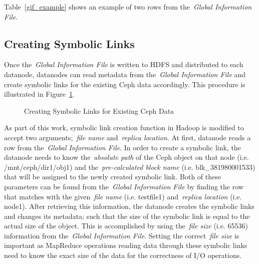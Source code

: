Table~\ref{gif_example} shows an example of two rows from the~\textit{Global Information File}.

\begin{table}[!htbp]
 \begin{center}
 \end{center}
 \caption{Example Rows from the~\textit{Global Information File}}
 \label{gif_example}
\end{table}

\subsection{Creating Symbolic Links}
\label{symlinks}
Once the~\textit{Global Information File} is written to HDFS and distributed to each datanode,
datanodes can read metadata from the~\textit{Global Information File} and create symbolic
links for the existing Ceph data accordingly. This procedure is illustrated in Figure~\ref{symbolic_lins}.

\begin{figure}[!htbp]
\centering
{}
\caption{Creating Symbolic Links for Existing Ceph Data}
\label{symbolic_lins}
\end{figure}

As part of this work, symbolic link creation function in Hadoop is modified to accept two arguments;~\textit{file name}
and~\textit{replica location}. At first, datanode reads a row from the~\textit{Global Information File}. In order to create a
symbolic link, the datanode needs to know the~\textit{absolute path} of the Ceph object on that node (i.e. /mnt/ceph/dir1/obj1)
and the~\textit{pre-calculated block name} (i.e. blk\_381980001533) that will be assigned to the newly created symbolic link.
Both of these parameters can be found from the~\textit{Global Information File} by finding the row that
matches with the given~\textit{file name} (i.e. testfile1) and~\textit{replica location} (i.e. node1). After retrieving this information,
the datanode creates the symbolic links and changes its metadata; such that the size of the symbolic link
is equal to the actual size of the object. This is accomplished by using the~\textit{file size} (i.e. 65536) information
from the~\textit{Global Information File}. Setting the correct~\textit{file size} is important as MapReduce
operations reading data through these symbolic links need to know the exact size of the data for the correctness
of I/O operations.

